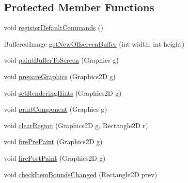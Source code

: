 \subsection*{\-Protected \-Member \-Functions}
\begin{DoxyCompactItemize}
\item 
void \hyperlink{classprefuse_1_1_display_a950d69b407851d27e6bd77bb5e8fca10}{register\-Default\-Commands} ()
\item 
\-Buffered\-Image \hyperlink{classprefuse_1_1_display_a1677624718c346edc5ca3be5cc87c1f1}{get\-New\-Offscreen\-Buffer} (int width, int height)
\item 
void \hyperlink{classprefuse_1_1_display_a97c62b448d5b3ab37a8d613251dd9a48}{paint\-Buffer\-To\-Screen} (\-Graphics g)
\item 
void \hyperlink{classprefuse_1_1_display_aaaf7d0fa8eebd69d652d973d2c0a17ae}{prepare\-Graphics} (\-Graphics2\-D g)
\item 
void \hyperlink{classprefuse_1_1_display_a3b093cbb40cf072bf84b6b89f7ab85f0}{set\-Rendering\-Hints} (\-Graphics2\-D g)
\item 
void \hyperlink{classprefuse_1_1_display_a327797805f6a5fd473a1218d148ccdca}{print\-Component} (\-Graphics g)
\item 
void \hyperlink{classprefuse_1_1_display_aec81db01b0b291ce585e0adcb5ffec75}{clear\-Region} (\-Graphics2\-D g, \-Rectangle2\-D r)
\item 
void \hyperlink{classprefuse_1_1_display_aac1b757eae35866141f1282b83a50cdc}{fire\-Pre\-Paint} (\-Graphics2\-D g)
\item 
void \hyperlink{classprefuse_1_1_display_a87785dbdc9cb8d8d5669c0b80a74d737}{fire\-Post\-Paint} (\-Graphics2\-D g)
\item 
void \hyperlink{classprefuse_1_1_display_ae84f94e13dd6055337750fb72c332ddb}{check\-Item\-Bounds\-Changed} (\-Rectangle2\-D prev)
\end{DoxyCompactItemize}
